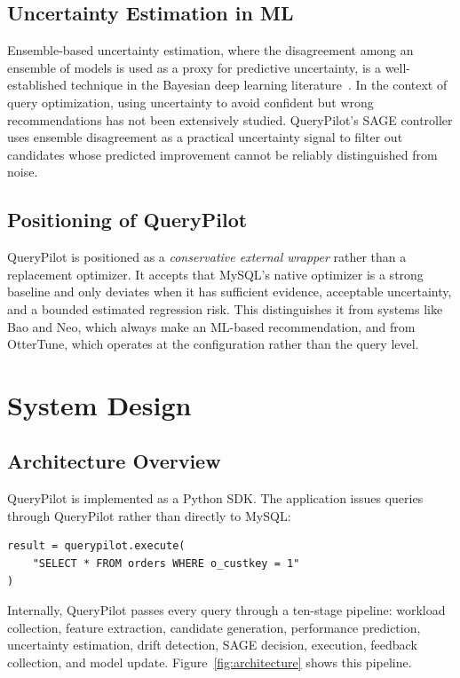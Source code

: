 \documentclass[conference]{IEEEtran}
\begin{document}
\subsection*{Uncertainty Estimation in ML}
Ensemble-based uncertainty estimation, where the disagreement among an
ensemble of models is used as a proxy for predictive uncertainty, is a
well-established technique in the Bayesian deep learning
literature~\cite{b8}. In the context of query optimization, using
uncertainty to avoid confident but wrong recommendations has not been
extensively studied. QueryPilot's SAGE controller uses ensemble disagreement
as a practical uncertainty signal to filter out candidates whose predicted
improvement cannot be reliably distinguished from noise.

\subsection*{Positioning of QueryPilot}
QueryPilot is positioned as a \textit{conservative external wrapper} rather
than a replacement optimizer. It accepts that MySQL's native optimizer is a
strong baseline and only deviates when it has sufficient evidence, acceptable
uncertainty, and a bounded estimated regression risk. This distinguishes it
from systems like Bao and Neo, which always make an ML-based recommendation,
and from OtterTune, which operates at the configuration rather than the
query level.

\section{System Design}

\subsection*{Architecture Overview}
QueryPilot is implemented as a Python SDK. The application issues queries
through QueryPilot rather than directly to MySQL:

\begin{verbatim}
result = querypilot.execute(
    "SELECT * FROM orders WHERE o_custkey = 1"
)
\end{verbatim}

Internally, QueryPilot passes every query through a ten-stage pipeline:
workload collection, feature extraction, candidate generation, performance
prediction, uncertainty estimation, drift detection, SAGE decision, execution,
feedback collection, and model update. Figure~\ref{fig:architecture} shows
this pipeline.
\end{document}
